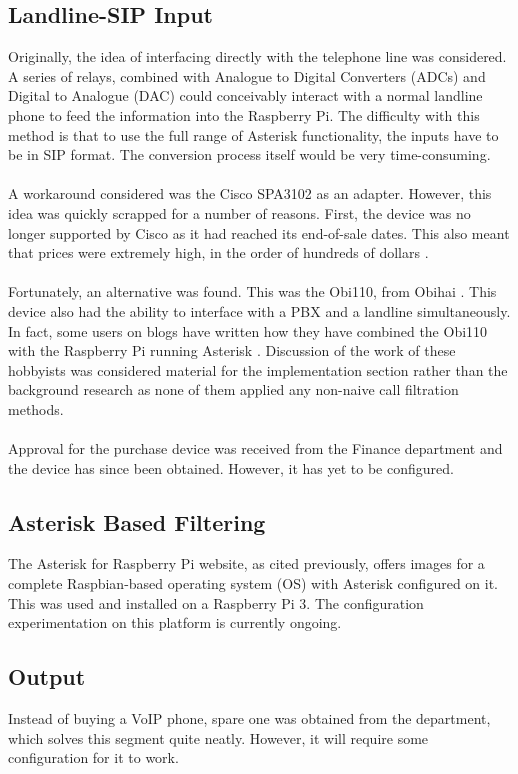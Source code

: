 \documentclass[12pt,a4paper]{report}
\begin{document}
\subsection{Landline-SIP Input}
Originally, the idea of interfacing directly with the telephone line was considered. A series of relays, combined with Analogue to Digital Converters (ADCs) and Digital to Analogue (DAC) could conceivably interact with a normal landline phone to feed the information into the Raspberry Pi. The difficulty with this method is that to use the full range of Asterisk functionality, the inputs have to be in SIP format. The conversion process itself would be very time-consuming.
\\\\
A workaround considered was the Cisco SPA3102 \cite{spa3102-specs} as an adapter. However, this idea was quickly scrapped for a number of reasons. First, the device was no longer supported by Cisco as it had reached its end-of-sale dates. This also meant that prices were extremely high, in the order of hundreds of dollars \cite{spa3102-amazon}.
\\\\
Fortunately, an alternative was found. This was the Obi110, from Obihai \cite{obi110-specs}. This device also had the ability to interface with a PBX and a landline simultaneously. In fact, some users on blogs have written how they have combined the Obi110 with the Raspberry Pi running Asterisk \cite{freepbx} \cite{bryanross}. Discussion of the work of these hobbyists was considered material for the implementation section rather than the background research as none of them applied any non-naive call filtration methods.
\\\\
Approval for the purchase device was received from the Finance department and the device has since been obtained. However, it has yet to be configured.

\subsection{Asterisk Based Filtering}
The Asterisk for Raspberry Pi website, as cited previously, offers images for a complete Raspbian-based operating system (OS) with Asterisk configured on it. This was used and installed on a Raspberry Pi 3. The configuration experimentation on this platform is currently ongoing.

\subsection{Output}
Instead of buying a VoIP phone, spare one was obtained from the department, which solves this segment quite neatly. However, it will require some configuration for it to work.
\end{document}
